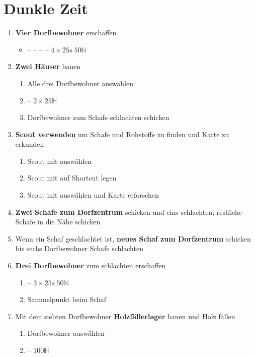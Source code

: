 \documentclass[10pt,twocolumn,a4paper]{article}
\begin{document}
\section{Dunkle Zeit}
\begin{enumerate}
\item \textbf{Vier Dorfbewohner} erschaffen \begin{itemize}\item{} --  --  --  -- \hfill$4\times25s~50 \mathbb{N}$\end{itemize}
\item\textbf{Zwei Häuser} bauen\begin{enumerate}\item Alle drei Dorfbewohner auswählen \item{} -- \hfill$2\times 25\mathbb{H}$\item Dorfbewohner zum Schafe schlachten schicken\end{enumerate}
\item \textbf{Scout verwenden} um Schafe und Rohstoffe zu finden und Karte zu erkunden\begin{enumerate}\item Scout mit \keys{,} auswählen \item Scout mit  auf Shortcut  legen \item Scout mit  auswählen und Karte erforschen\end{enumerate}
\item \textbf{Zwei Schafe zum Dorfzentrum} schicken und eins schlachten, restliche Schafe in die Nähe schicken
\item Wenn ein Schaf geschlachtet ist, \textbf{neues Schaf zum Dorfzentrum} schicken bis sechs Dorfbewohner Schafe schlachten
\item \textbf{Drei Dorfbewohner} zum schlachten erschaffen\begin{enumerate}\item {} -- \hfill$3\times 25s~50\mathbb{N}$ \item Sammelpunkt beim Schaf\end{enumerate}
\item Mit dem siebten Dorfbewohner \textbf{Holzfällerlager} bauen und Holz fällen\begin{enumerate}\item Dorfbewohner auswählen \item {} -- \hfill$100\mathbb{H}$\end{enumerate}

\end{enumerate}
\end{document}
